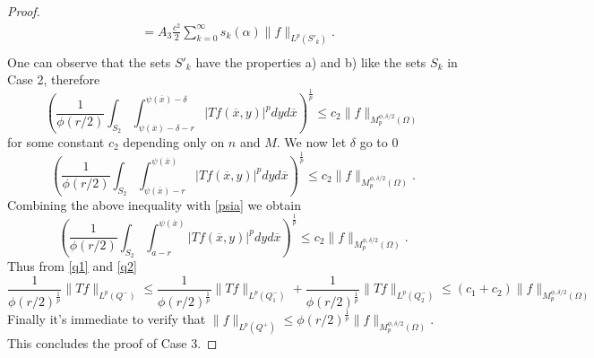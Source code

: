 \documentclass[12pt]{article}
\theoremstyle{definition}
\begin{document}
\begin{proof}
\begin{align*}
&=A_3 \frac{c^2}{2} \sum_{k=0}^\infty s_k(\alpha) \|f\|_{L^p(S'_k)}. \\
\end{align*}
One can observe that the sets $S'_k$ have the properties a) and b) like the sets $S_k$ in Case 2, therefore
\[  \left(\frac{1}{\phi(r/2)}\int_{S_2} \int_{\psi(\overline x)-\delta-r}^{\psi(\overline x)-\delta}|Tf(\overline x,y)|^p dy d\overline x\right)^{\frac{1}{p}}\le c_2 \| f\|_{M_p^{\phi,\delta/2}(\Omega)} \]
for some constant $c_2$ depending only on $n$ and $M$. We now let $\delta$ go to 0 
\begin{equation}
  \left(\frac{1}{\phi(r/2)}\int_{S_2} \int_{\psi(\overline x)-r}^{\psi(\overline x)}|Tf(\overline x,y)|^p dy d\overline x\right)^{\frac{1}{p}}\le c_2 \| f\|_{M_p^{\phi,\delta/2}(\Omega)} . \label{q2}
 \end{equation}
Combining the above inequality with \eqref{psia} we obtain
\[  \left(\frac{1}{\phi(r/2)}\int_{S_2} \int_{a-r}^{\psi(\overline x)}|Tf(\overline x,y)|^p dy d\overline x\right)^{\frac{1}{p}}\le c_2 \| f\|_{M_p^{\phi,\delta/2}(\Omega)} .\]
Thus from \eqref{q1} and \eqref{q2}
\[ \frac{1}{\phi(r/2)^{\frac{1}{p}}} \| Tf\|_{L^p(Q^-)} \le \frac{1}{\phi(r/2)^{\frac{1}{p}}} \| Tf\|_{L^p(Q^-_1)} +\frac{1}{\phi(r/2)^{\frac{1}{p}}} \| Tf\|_{L^p(Q^-_2)} \le (c_1 +c_2)\| f\|_{M_p^{\phi,\delta/2}(\Omega)} \]
 Finally it's immediate to verify that $\| f\|_{L^p(Q^+)} \le \phi(r/2)^{\frac{1}{p}} \| f\|_{M_p^{\phi,\delta/2}(\Omega)}.$ This concludes the proof of Case 3.


\end{proof}
\end{document}
